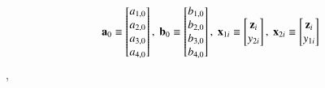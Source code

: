 \documentclass[10pt, reqno]{amsart}
\begin{document}
    \[
    \bolda_0 \equiv \begin{bmatrix}
        a_{1, 0}\\
        a_{2, 0}\\
        a_{3, 0}\\
        a_{4, 0}
        \end{bmatrix}    
        , \  
        \boldb_0 \equiv \begin{bmatrix}
            b_{1, 0}\\
            b_{2, 0}\\
            b_{3, 0}\\
            b_{4, 0}
            \end{bmatrix}   
            , \ 
            \boldx_{1i} \equiv \begin{bmatrix}
                \boldz_i\\
                y_{2i}
                \end{bmatrix}     
                , \ 
                \boldx_{2i} \equiv \begin{bmatrix}
                    \boldz_i\\
                    y_{1i}
                    \end{bmatrix}     
    \],
    
\end{document}
